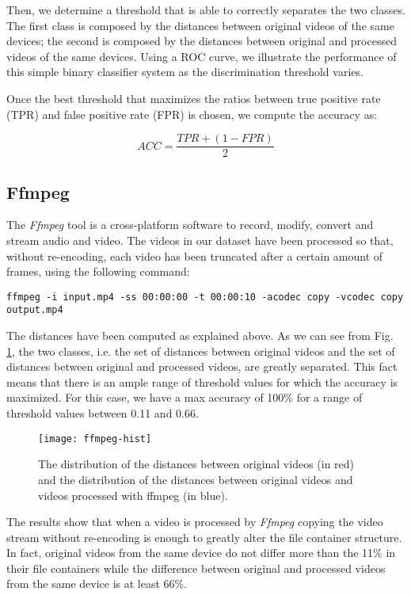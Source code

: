 Then, we determine a threshold that is able to correctly separates the two classes. The first class is composed by the distances between original videos of the same devices; the second is composed by the distances between original and processed videos of the same devices. Using a ROC curve, we illustrate the performance of this simple binary classifier system as the discrimination threshold varies.

Once the best threshold that maximizes the ratios between true positive rate (TPR) and false positive rate (FPR) is chosen, we compute the accuracy as:

\begin{equation}\label{eq:accuracy}
ACC = \dfrac{TPR + (1 - FPR)}{2}
\end{equation}

\subsection{Ffmpeg}

The \emph{Ffmpeg} tool is a cross-platform software to record, modify, convert and stream audio and video. The videos in our dataset have been processed so that, without re-encoding, each video has been truncated after a certain amount of frames, using the following command:

\begin{lstlisting}
ffmpeg -i input.mp4 -ss 00:00:00 -t 00:00:10 -acodec copy -vcodec copy output.mp4
\end{lstlisting}

The distances have been computed as explained above. As we can see from Fig. \ref{fig:ffmpeg-hist}, the two classes, i.e. the set of distances between original videos and the set of distances between original and processed videos, are greatly separated. This fact means that there is an ample range of threshold values for which the accuracy is maximized. For this case, we have a max accuracy of 100\% for a range of threshold values between 0.11 and 0.66.

\begin{figure}
  \centering
  \texttt{[image: ffmpeg-hist]}
  \caption{The distribution of the distances between original videos (in red) and the distribution of the distances between original videos and videos processed with ffmpeg (in blue).}\label{fig:ffmpeg-hist}
\end{figure}

The results show that when a video is processed by \emph{Ffmpeg} copying the video stream without re-encoding is enough to greatly alter the file container structure. In fact, original videos from the same device do not differ more than the 11\% in their file containers while the difference between original and processed videos from the same device is at least 66\%.

